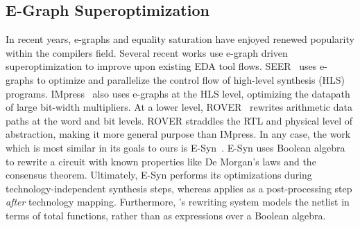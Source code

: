 \subsection{E-Graph Superoptimization}\label{sec:relatedwork:egraph}
In recent years, e-graphs and equality saturation have enjoyed renewed
popularity within the compilers field. Several recent works use e-graph driven
superoptimization to improve upon existing EDA tool flows. SEER~\cite{seer}
uses e-graphs to optimize and parallelize the control flow of high-level
synthesis (HLS) programs. IMpress~\cite{impress} also uses e-graphs at the HLS
level, optimizing the datapath of large bit-width multipliers. At a lower
level, ROVER~\cite{rover,roverbl,egraphconstraints} rewrites arithmetic data
paths at the word and bit levels. ROVER straddles the RTL and physical level of
abstraction, making it more general purpose than IMpress. In any case, the work
which is most similar in its goals to ours is E-Syn~\cite{esynth}.
 E-Syn uses Boolean algebra to
rewrite a circuit with known properties like De Morgan's laws and the consensus
theorem. Ultimately, E-Syn performs its optimizations during
technology-independent synthesis steps, whereas \shortname{} applies as a
post-processing step \textit{after} technology mapping. Furthermore,
\shortname{}'s rewriting system models the netlist in terms of total functions,
rather than as expressions over a Boolean algebra.